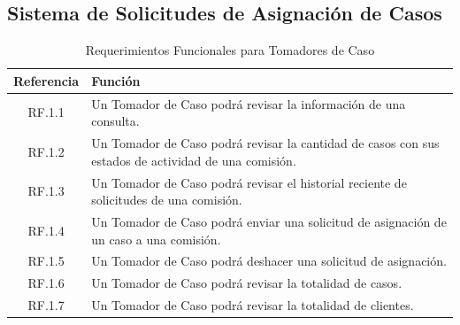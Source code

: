 \subsection{Sistema de Solicitudes de Asignación de Casos}

\begin{table}[H]
    \centering
    \begin{tabular}{|c|p{10cm}|}
        \hline
        \textbf{Referencia} & \textbf{Función} \\
        \hline
        RF.1.1 & Un Tomador de Caso podrá revisar la información de una consulta. \\
        \hline
        RF.1.2 & Un Tomador de Caso podrá revisar la cantidad de casos con sus estados de actividad de una comisión. \\
        \hline
        RF.1.3 & Un Tomador de Caso podrá revisar el historial reciente de solicitudes de una comisión. \\
        \hline
        RF.1.4 & Un Tomador de Caso podrá enviar una solicitud de asignación de un caso a una comisión. \\
        \hline
        RF.1.5 & Un Tomador de Caso podrá deshacer una solicitud de asignación. \\
        \hline
        RF.1.6 & Un Tomador de Caso podrá revisar la totalidad de casos. \\
        \hline
        RF.1.7 & Un Tomador de Caso podrá revisar la totalidad de clientes. \\
        \hline
    \end{tabular}
    \caption{Requerimientos Funcionales para Tomadores de Caso}
    \label{tab:rf-tomadores-caso}
\end{table}



